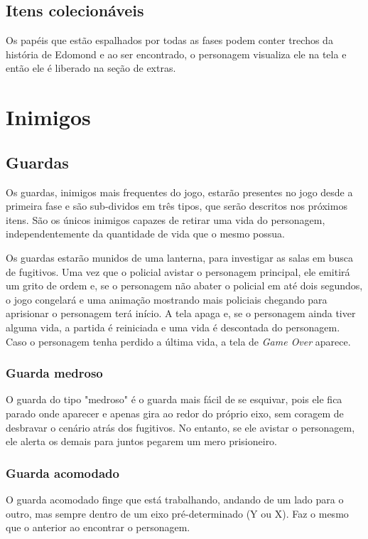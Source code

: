 \subsection{\label{colecionaveis}{Itens colecionáveis}}
Os papéis que estão espalhados por todas as fases podem conter trechos da história de Edomond e ao ser encontrado, o personagem visualiza ele na tela e então ele é liberado na seção de extras. 

\section{Inimigos}
\subsection{Guardas}

Os guardas, inimigos mais frequentes do jogo, estarão presentes no jogo desde a primeira fase e são sub-dividos em três tipos, que serão descritos nos próximos itens. São os únicos inimigos capazes de retirar uma vida do personagem, independentemente da quantidade de vida que o mesmo possua.

Os guardas estarão munidos de uma lanterna, para investigar as salas em busca de fugitivos. Uma vez que o policial avistar o personagem principal, ele emitirá um grito de ordem e, se o personagem não abater o policial em até dois segundos, o jogo congelará e uma animação mostrando mais policiais chegando para aprisionar o personagem terá início. A tela apaga e, se o personagem ainda tiver alguma vida, a partida é reiniciada e uma vida é descontada do personagem. Caso o personagem tenha perdido a última vida, a tela de \textit{Game Over} aparece.

\subsubsection*{Guarda medroso}

O guarda do tipo "medroso" é o guarda mais fácil de se esquivar, pois ele fica parado onde aparecer e apenas gira ao redor do próprio eixo, sem coragem de desbravar o cenário atrás dos fugitivos. No entanto, se ele avistar o personagem, ele alerta os demais para juntos pegarem um mero prisioneiro.

\subsubsection*{Guarda acomodado}

O guarda acomodado finge que está trabalhando, andando de um lado para o outro, mas sempre dentro de um eixo pré-determinado (Y ou X). Faz o mesmo que o anterior ao encontrar o personagem.

